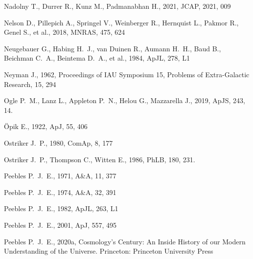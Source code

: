 \documentclass[fleqn,usenatbib]{mnras}
\begin{document}
\begin{thebibliography}{}

 Nadolny T., Durrer R., Kunz M., Padmanabhan H., 2021, JCAP, 2021, 009


 Nelson D., Pillepich A., Springel V., Weinberger R., Hernquist L., Pakmor R., Genel S., et al., 2018, MNRAS, 475, 624

 Neugebauer G., Habing H.~J., van Duinen R., Aumann H.~H., Baud B., Beichman C.~A., Beintema D.~A., et al., 1984, ApJL, 278, L1

 Neyman J., 1962, Proceedings of IAU Symposium 15, Problems of Extra-Galactic Research, 15, 294

 Ogle P.~M., Lanz L., Appleton P.~N., Helou G., Mazzarella J., 2019, ApJS, 243, 14. %

 \"Opik E., 1922, ApJ, 55, 406

 Ostriker J.~P., 1980, ComAp, 8, 177

 Ostriker J.~P., Thompson C., Witten E., 1986, PhLB, 180, 231.

 Peebles P.~J.~E., 1971, A\&A, 11, 377

 Peebles P.~J.~E., 1974, A\&A, 32, 391

 Peebles P.~J.~E., 1982, ApJL, 263, L1

 Peebles P.~J.~E., 2001, ApJ, 557, 495

 Peebles P.~J.~E., 2020a, Cosmology's Century: An Inside History of our Modern Understanding of the Universe. Princeton: Princeton University Press


\end{thebibliography}
\end{document}
